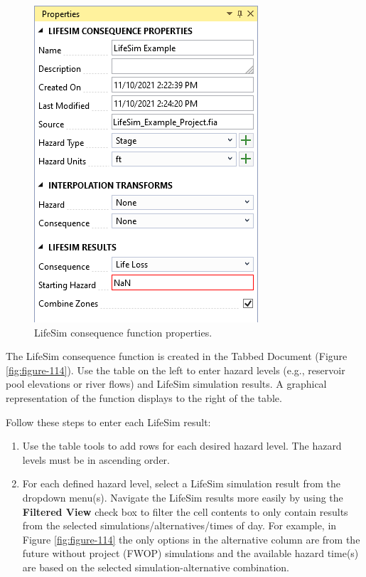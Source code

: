 \documentclass[
]{book}
\begin{document}
\begin{figure}

{\centering \includegraphics{images/figure113} 

}

\caption{LifeSim consequence function properties.}\label{fig:figure-113}
\end{figure}

The LifeSim consequence function is created in the Tabbed Document (Figure \ref{fig:figure-114}). Use the table on the left to enter hazard levels (e.g., reservoir pool elevations or river flows) and LifeSim simulation results. A graphical representation of the function displays to the right of the table.

Follow these steps to enter each LifeSim result:

\begin{enumerate}
\def\labelenumi{\arabic{enumi}.}
\item
  Use the table tools to add rows for each desired hazard level. The hazard levels must be in ascending order.
\item
  For each defined hazard level, select a LifeSim simulation result from the dropdown menu(s). Navigate the LifeSim results more easily by using the \textbf{Filtered View} check box to filter the cell contents to only contain results from the selected simulations/alternatives/times of day. For example, in Figure \ref{fig:figure-114} the only options in the alternative column are from the future without project (FWOP) simulations and the available hazard time(s) are based on the selected simulation-alternative combination.
\end{enumerate}
\end{document}
